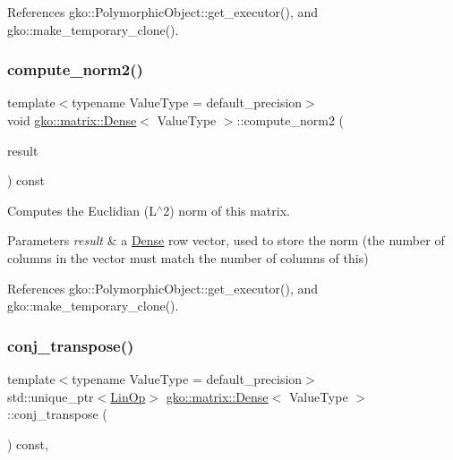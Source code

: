 References gko\+::\+Polymorphic\+Object\+::get\+\_\+executor(), and gko\+::make\+\_\+temporary\+\_\+clone().

\mbox{\label{classgko_1_1matrix_1_1Dense_a97fd354c4a26814586cd256b5f0d7bea}} 
\subsubsection{\texorpdfstring{compute\+\_\+norm2()}{compute\_norm2()}}
{\footnotesize\ttfamily template$<$typename Value\+Type = default\+\_\+precision$>$ \\
void \hyperlink{classgko_1_1matrix_1_1Dense}{gko\+::matrix\+::\+Dense}$<$ Value\+Type $>$\+::compute\+\_\+norm2 (\begin{DoxyParamCaption}\item[{\hyperlink{classgko_1_1LinOp}{Lin\+Op} $\ast$}]{result }\end{DoxyParamCaption}) const\hspace{0.3cm}{\ttfamily [inline]}}



Computes the Euclidian (L$^\wedge$2) norm of this matrix. 


\begin{DoxyParams}{Parameters}
{\em result} & a \hyperlink{classgko_1_1matrix_1_1Dense}{Dense} row vector, used to store the norm (the number of columns in the vector must match the number of columns of this) \\
\hline
\end{DoxyParams}


References gko\+::\+Polymorphic\+Object\+::get\+\_\+executor(), and gko\+::make\+\_\+temporary\+\_\+clone().

\mbox{\label{classgko_1_1matrix_1_1Dense_a19890b1448497a50d57c16ed4c3bd820}} 
\subsubsection{\texorpdfstring{conj\+\_\+transpose()}{conj\_transpose()}}
{\footnotesize\ttfamily template$<$typename Value\+Type = default\+\_\+precision$>$ \\
std\+::unique\+\_\+ptr$<$\hyperlink{classgko_1_1LinOp}{Lin\+Op}$>$ \hyperlink{classgko_1_1matrix_1_1Dense}{gko\+::matrix\+::\+Dense}$<$ Value\+Type $>$\+::conj\+\_\+transpose (\begin{DoxyParamCaption}{ }\end{DoxyParamCaption}) const\hspace{0.3cm}{\ttfamily [override]}, {\ttfamily [virtual]}}



